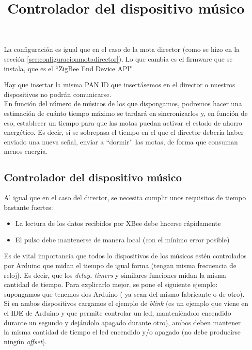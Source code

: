 La configuración es igual que en el caso de la mota director (como se hizo en la sección
\ref{sec:configuracionmotadirector}). Lo que cambia es el firmware que se instala, que es el
``ZigBee End Device API".

Hay que insertar la misma PAN ID que insertásemos en el director o nuestros dispositivos
no podrán comunicarse.\\

En función del número de músicos de los que dispongamos, podremos hacer una estimación de
cuánto tiempo máximo se tardará en sincronizarlos y, en función de eso,
establecer un tiempo para que las motas puedan activar el estado de ahorro energético.
Es decir, si se sobrepasa el tiempo en el que el director debería haber enviado una
nueva señal, enviar a ``dormir"\ las motas, de forma que consuman menos energía.


\subsection{Controlador del dispositivo músico}
\title{Controlador del dispositivo músico}
\label{sec:controladormusico}
Al igual que en el caso del director, se necesita cumplir unos requisitos de tiempo
bastante fuertes:
\begin{itemize}
  \item La lectura de los datos recibidos por XBee debe hacerse rápidamente
  \item El pulso debe mantenerse de manera local (con el mínimo error posible)
\end{itemize}

Es de vital importancia que todos lo dispositivos de los músicos estén controlados
por Arduino que midan el tiempo de igual forma (tengan misma frecuencia de reloj). Es decir, que los \textit{delay,
timers} y similares funciones midan la misma cantidad de tiempo. Para explicarlo
mejor, se pone el siguiente ejemplo:\\
supongamos que tenemos dos Arduino ( ya sean del mismo fabricante o de otro). Si en ambos dispositivos
cargamos el ejemplo de \textit{blink} \cite{arduinoBlink} (es un ejemplo que viene
en el IDE de Arduino y que permite controlar un led, manteniéndolo encendido durante un segundo
y dejándolo apagado durante otro), ambos deben mantener la misma cantidad de tiempo
el led encendido y/o apagado (no debe producirse ningún \textit{offset}).\\

